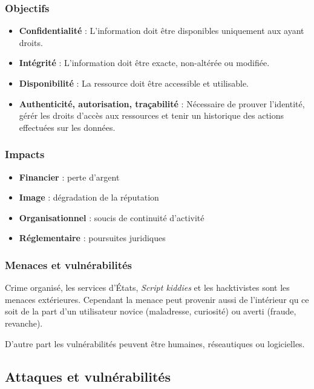 \documentclass[12pt, a4paper]{article}
\begin{document}
	\subsubsection{Objectifs}
	\begin{itemize}
		\item \textbf{Confidentialité} : L'information doit être disponibles uniquement aux ayant droits.
		\item \textbf{Intégrité} : L'information doit être exacte, non-altérée ou modifiée.
		\item \textbf{Disponibilité} : La ressource doit être accessible et utilisable.
		\item \textbf{Authenticité, autorisation, traçabilité} : Nécessaire de prouver l'identité, gérér les droits d'accès aux ressources et tenir un historique des actions effectuées sur les données.
	\end{itemize}
	\subsubsection{Impacts}
	\begin{itemize}
		\item \textbf{Financier} : perte d'argent
		\item \textbf{Image} : dégradation de la réputation
		\item \textbf{Organisationnel} : soucis de continuité d'activité
		\item \textbf{Réglementaire} : poursuites juridiques
	\end{itemize}
	\subsubsection{Menaces et vulnérabilités}
	Crime organisé, les services d'États, \textit{Script kiddies} et les hacktivistes sont les menaces extérieures. Cependant la menace peut provenir aussi de l'intérieur qu ce soit de la part d'un utilisateur novice (maladresse, curiosité) ou averti (fraude, revanche).
	\par
	D'autre part les vulnérabilités peuvent être humaines, réseautiques ou logicielles.
	\subsection{Attaques et vulnérabilités}
\end{document}
